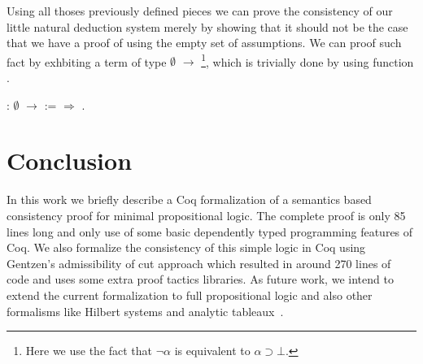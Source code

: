 Using all thoses previously defined pieces we can prove the consistency of our little natural
deduction system merely by showing that it should not be the case that we have a proof of 
using the empty set of assumptions. We can proof such fact by exhbiting a term of type
 $\emptyset$  \ensuremath{\rightarrow} \footnote{Here we use the fact that $\neg \alpha$ is
equivalent to $\alpha \supset \bot$.}, which is trivially done by using function .
 \begin{coqdoccode}
\coqdocemptyline
\coqdocnoindent
{}  :  $\emptyset$  \ensuremath{\rightarrow}  :=   \ensuremath{\Rightarrow}   .\coqdoceol
\coqdocemptyline
\end{coqdoccode}
\section{Conclusion}\label{sec:conclusion}


In this work we briefly describe a Coq formalization of a semantics based consistency proof for
minimal propositional logic. The complete proof is only 85 lines long and only use of some basic
dependently typed programming features of Coq. We also
formalize the consistency of this simple logic in Coq using Gentzen's admissibility of cut approach
which resulted in around 270 lines of code and uses some extra proof tactics libraries.
As future work, we intend to extend the current formalization to full propositional logic and also
other formalisms like Hilbert systems and analytic tableaux~\cite{smullyan1995first}.
 \begin{coqdoccode}
\end{coqdoccode}
